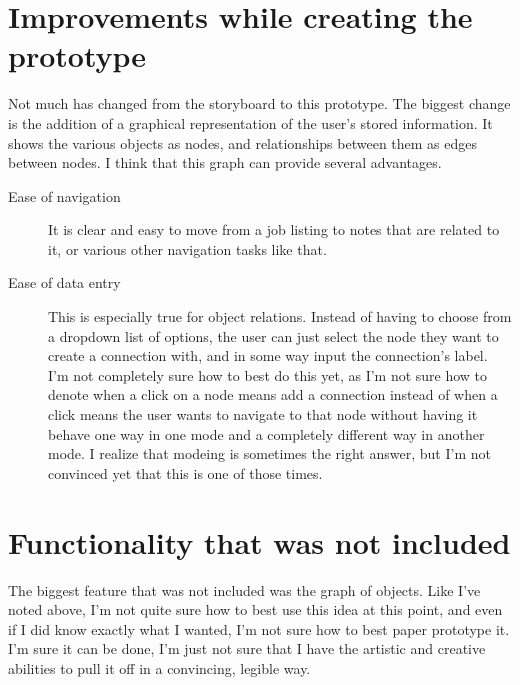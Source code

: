 \documentclass[12pt, letter]{article}
\begin{document}
\section{Improvements while creating the prototype}
Not much has changed from the storyboard to this prototype.  The biggest change is the addition of a graphical representation of the user's stored information.  It shows the various objects as nodes,  and relationships between them as edges between nodes.   I think that this graph can provide several advantages.
\begin{description}
\item [Ease of navigation]  It is  clear and easy to move from a job listing to notes that are related to it, or various other navigation tasks like that.
\item [Ease of data entry]  This is especially true for object relations.  Instead of having to choose from a dropdown list of options, the user can just select the node they want to create a connection with, and in some way input the connection's label.  I'm not completely sure how to best do this yet, as I'm not sure how to denote when a click on a node means add a connection instead of when a click means the user wants to navigate to that node without having it behave one way in one mode and a completely different way in another mode.  I realize that modeing is sometimes the right answer, but I'm not convinced yet that this is one of those times.
\end{description}

\section{Functionality that was not included}
The biggest feature that was not included was the graph of objects.  Like I've noted above, I'm not quite sure how to best use this idea at this point, and even if I did know exactly what I wanted, I'm not sure how to best paper prototype it.  I'm sure it can be done, I'm just not sure that I have the artistic and creative abilities to pull it off in a convincing, legible way.
\end{document}
